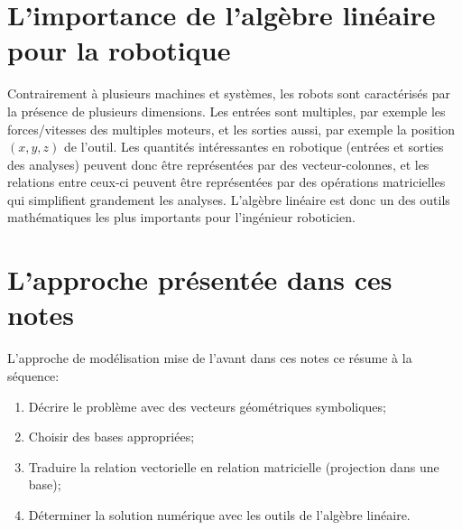 

\section{L'importance de l'algèbre linéaire pour la robotique}

Contrairement à plusieurs machines et systèmes, les robots sont caractérisés par la présence de plusieurs dimensions. Les entrées sont multiples, par exemple les forces/vitesses des multiples moteurs, et les sorties aussi, par exemple la position $(x,y,z)$ de l'outil. Les quantités intéressantes en robotique (entrées et sorties des analyses) peuvent donc être représentées par des vecteur-colonnes, et les relations entre ceux-ci peuvent être représentées par des opérations matricielles qui simplifient grandement les analyses. L'algèbre linéaire est donc un des outils mathématiques les plus importants pour l'ingénieur roboticien. 


\newpage
\section{L'approche présentée dans ces notes}

L'approche de modélisation mise de l'avant dans ces notes ce résume à la séquence:
\begin{enumerate}
	\item Décrire le problème avec des vecteurs géométriques symboliques;
	\item Choisir des bases appropriées;
	\item Traduire la relation vectorielle en relation matricielle (projection dans une base);
	\item Déterminer la solution numérique avec les outils de l'algèbre linéaire.
\end{enumerate}

